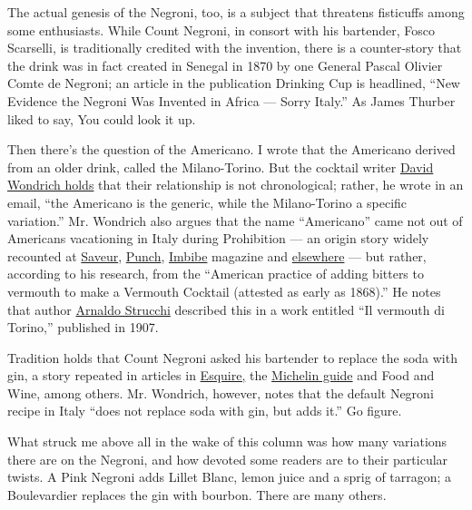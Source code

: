 The actual genesis of the Negroni, too, is a subject that threatens
fisticuffs among some enthusiasts. While Count Negroni, in consort with
his bartender, Fosco Scarselli, is traditionally credited with the
invention, there is a counter-story that the drink was in fact created
in Senegal in 1870 by one General Pascal Olivier Comte de Negroni; an
article in the publication Drinking Cup is headlined, ``New Evidence the
Negroni Was Invented in Africa --- Sorry Italy.'' As James Thurber liked
to say, You could look it up.

Then there's the question of the Americano. I wrote that the Americano
derived from an older drink, called the Milano-Torino. But the cocktail
writer
\href{https://www.thedailybeast.com/the-history-of-how-the-negroni-conquered-america}{David
Wondrich holds} that their relationship is not chronological; rather, he
wrote in an email, ``the Americano is the generic, while the
Milano-Torino a specific variation.'' Mr. Wondrich also argues that the
name ``Americano'' came not out of Americans vacationing in Italy during
Prohibition --- an origin story widely recounted at
\href{https://www.saveur.com/article/Recipes/Americano}{Saveur},
\href{https://punchdrink.com/recipes/americano/}{Punch},
\href{http://imbibemagazine.com/recipe-americano/}{Imbibe} magazine and
\href{https://drinkstraightup.com/2013/01/20/americano/}{elsewhere} ---
but rather, according to his research, from the ``American practice of
adding bitters to vermouth to make a Vermouth Cocktail (attested as
early as 1868).'' He notes that author
\href{https://www.amazon.com/Vermouth-Torino-Monografia-Incisioni-Fototipiche/dp/1359865985}{Arnaldo
Strucchi} described this in a work entitled ``Il vermouth di Torino,''
published in 1907.

Tradition holds that Count Negroni asked his bartender to replace the
soda with gin, a story repeated in articles in
\href{https://www.esquire.com/food-drink/drinks/recipes/a3683/negroni-drink-recipe/}{Esquire,}
the
\href{https://guide.michelin.com/us/en/washington/washington-dc/article/features/negroni-week-guide-recipe}{Michelin
guide} and Food and Wine, among others. Mr. Wondrich, however, notes
that the default Negroni recipe in Italy ``does not replace soda with
gin, but adds it.'' Go figure.

What struck me above all in the wake of this column was how many
variations there are on the Negroni, and how devoted some readers are to
their particular twists. A Pink Negroni adds Lillet Blanc, lemon juice
and a sprig of tarragon; a Boulevardier replaces the gin with bourbon.
There are many others.

